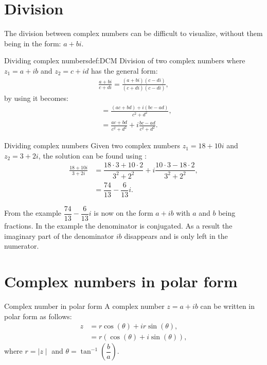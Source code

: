 \section{Division}
The division between complex numbers can be difficult to visualize, without them being in the form: $a + bi$. 
\begin{definition}{Dividing complex numbers}{def:DCM}
Division of two complex numbers where $z_1=a+ib$ and $z_2=c+id$ has the general form:
\begin{align*}
\frac{a + bi}{c + di} = \frac{(a+bi)(c-di)}{(c+di)(c-di)},
\end{align*}
by using  it becomes:  
\begin{align*}
&= \frac{(ac+bd)+i(bc-ad)}{c^2+d^2},							\\[1em]
&= \frac{ac+bd}{c^2+d^2}+i \frac{bc-ad}{c^2+d^2}.				
\end{align*}
\end{definition}
\begin{example}{Dividing complex numbers}{}
Given two complex numbers $z_1=18+10i$ and $z_2=3+2i$, the solution can be found using :
\begin{align*}
\frac{18 + 10i}{3 + 2i} &= \dfrac{18\cdot3+10\cdot2}{3^2+2^2}+i\dfrac{10\cdot3-18\cdot2}{3^2+2^2},
\\
&=\dfrac{74}{13}-\dfrac{6}{13}i.
\end{align*}
\end{example}


\noindent From the example $\dfrac{74}{13} - \dfrac{6}{13}i$ is now on the form $a+ib$ with $a$ and $b$ being fractions. In the example the denominator is conjugated. As a result the imaginary part of the denominator $ib$ disappears and is only left in the numerator. 


\section{Complex numbers in polar form}

\begin{definition}{Complex number in polar form}{}
A complex number $z=a+ib$ can be written in polar form as follows:
\begin{align*}
z&=r\cos(\theta)+ir\sin(\theta),
\\
&=r\left(\cos(\theta)+i\sin(\theta)\right),
\end{align*}
where $r=\mid z \mid$ and $\theta=\tan^{-1}\left(\dfrac{b}{a} \right).$
\end{definition}


